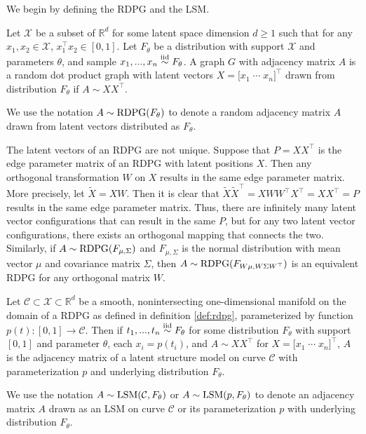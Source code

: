 \documentclass[12pt]{article}
\begin{document}
We begin by defining the RDPG and the LSM.

\begin{definition}
\label{def:rdpg}
Let $\mathcal{X}$ be a subset of $\mathbb{R}^d$ for some latent space dimension $d \geq 1$ such that for any $x_1, x_2 \in \mathcal{X}$, $x_1^\top x_2 \in [0, 1]$. 
Let $F_\theta$ be a distribution with support $\mathcal{X}$ and parameters $\theta$, and sample $x_1, ..., x_n \stackrel{\mathrm{iid}}{\sim} F_\theta$. 
A graph $G$ with adjacency matrix $A$ is a random dot product graph with latent vectors $X = \bigl[x_1 \; \cdots \; x_n\bigr]^\top$ drawn from distribution $F_\theta$ if $A \sim X X^\top$. 

We use the notation $A \sim \mathrm{RDPG}(F_\theta)$ to denote a random adjacency matrix $A$ drawn from latent vectors distributed as $F_\theta$. 
\end{definition}

\begin{remark}
\label{remark:nonunique}
The latent vectors of an RDPG are not unique. 
Suppose that $P = X X^\top$ is the edge parameter matrix of an RDPG with latent positions $X$. 
Then any orthogonal transformation $W$ on $X$ results in the same edge parameter matrix. 
More precisely, let $\tilde{X} = X W$. 
Then it is clear that $\tilde{X} \tilde{X}^\top = X W W^\top X^\top = X X^\top = P$ results in the same edge parameter matrix. 
Thus, there are infinitely many latent vector configurations that can result in the same $P$, but for any two latent vector configurations, there exists an orthogonal mapping that connects the two. 
Similarly, if $A \sim \mathrm{RDPG}(F_{\mu, \Sigma})$ and $F_{\mu, \Sigma}$ is the normal distribution with mean vector $\mu$ and covariance matrix $\Sigma$, then $A \sim \mathrm{RDPG}(F_{W \mu, W \Sigma W^\top})$ is an equivalent RDPG for any orthogonal matrix $W$. 
\end{remark}

\begin{definition}
\label{def:lsm}
Let $\mathcal{C} \subset \mathcal{X} \subset \mathbb{R}^d$ be a smooth, nonintersecting one-dimensional manifold on the domain of a RDPG as defined in definition \ref{def:rdpg}, parameterized by function $p(t) : [0, 1] \to \mathcal{C}$. 
Then if $t_1, ..., t_n \stackrel{\mathrm{iid}}{\sim} F_\theta$ for some distribution $F_\theta$ with support $[0, 1]$ and parameter $\theta$, each $x_i = p(t_i)$, and $ A \sim X X^\top$ for $X = \bigl[x_1 \; \cdots \; x_n\bigr]^\top$, $A$ is the adjacency matrix of a latent structure model on curve $\mathcal{C}$ with parameterization $p$ and underlying distribution $F_\theta$. 

We use the notation $A \sim \mathrm{LSM}(\mathcal{C}, F_\theta)$ or $A \sim \mathrm{LSM}(p, F_\theta)$ to denote an adjacency matrix $A$ drawn as an LSM on curve $\mathcal{C}$ or its parameterization $p$ with underlying distribution $F_\theta$. 
\end{definition}
\end{document}
